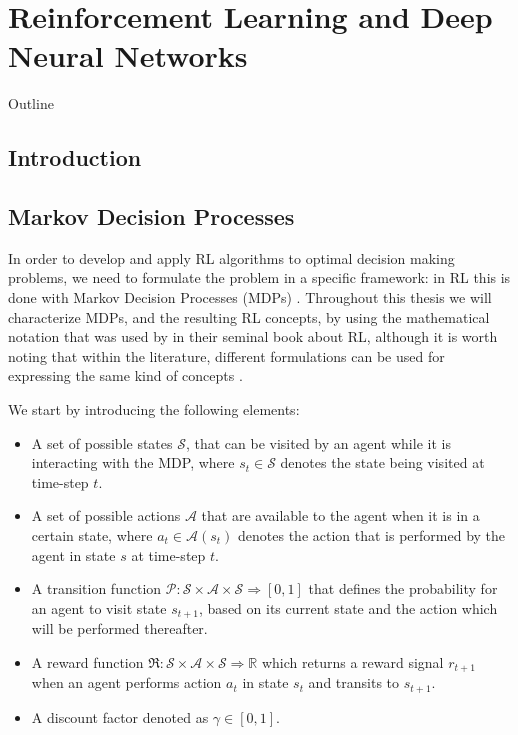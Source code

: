 \chapter{Reinforcement Learning and Deep Neural Networks}
\label{ch:reinforcement_learning}


\begin{remark}{Outline}

\end{remark}

\section{Introduction}
\label{sec:rl_introduction}


\section{Markov Decision Processes}
\label{sec:mdps}

In order to develop and apply RL algorithms to optimal decision making problems, we need to formulate the problem in a specific framework: in RL this is done with Markov Decision Processes (MDPs) \cite{puterman1990markov,puterman2014markov}. Throughout this thesis we will characterize MDPs, and the resulting RL concepts, by using the mathematical notation that was used by \citet{sutton2018reinforcement} in their seminal book about RL, although it is worth noting that within the literature, different formulations can be used for expressing the same kind of concepts \cite{bertsekas1995neuro,busoniu2010reinforcement,bertsekas2000dynamic,bertsekas2019reinforcement}.

We start by introducing the following elements:
\begin{itemize}
	\item A set of possible states $\mathcal{S}$, that can be visited by an agent while it is interacting with the MDP, where $s_t \in \mathcal{S}$ denotes the state being visited at time-step $t$.
	\item A set of possible actions $\mathcal{A}$ that are available to the agent when it is in a certain state, where $a_t \in \mathcal{A}(s_t)$ denotes the action that is performed by the agent in state $s$ at time-step $t$.
\item A transition function $\mathcal{P}:\mathcal{S}\times\mathcal{A}\times\mathcal{S}\Rightarrow [0,1]$ that defines the probability for an agent to visit state $s_{t+1}$, based on its current state and the action which will be performed thereafter.
\item A reward function $\Re:\mathcal{S}\times\mathcal{A}\times\mathcal{S}\Rightarrow \mathbb{R}$ which returns a reward signal $r_{t+1}$ when an agent performs action $a_t$ in state $s_t$ and transits to $s_{t+1}$.
\item A discount factor denoted as $\gamma \in [0,1]$.

\end{itemize}

